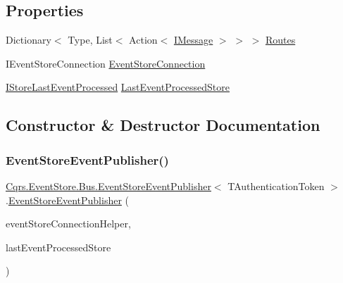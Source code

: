 \subsection*{Properties}
\begin{DoxyCompactItemize}
\item 
Dictionary$<$ Type, List$<$ Action$<$ \hyperlink{interfaceCqrs_1_1Messages_1_1IMessage}{I\+Message} $>$ $>$ $>$ \hyperlink{classCqrs_1_1EventStore_1_1Bus_1_1EventStoreEventPublisher_a89bf01d1921bc517ea8b385c0ee724ee}{Routes}
\item 
I\+Event\+Store\+Connection \hyperlink{classCqrs_1_1EventStore_1_1Bus_1_1EventStoreEventPublisher_a16df48a7203bc3bcde5f5a12f1d47934}{Event\+Store\+Connection}
\item 
\hyperlink{interfaceCqrs_1_1Bus_1_1IStoreLastEventProcessed}{I\+Store\+Last\+Event\+Processed} \hyperlink{classCqrs_1_1EventStore_1_1Bus_1_1EventStoreEventPublisher_a552a16f86c52837bf81200778e3a9fe4}{Last\+Event\+Processed\+Store}
\end{DoxyCompactItemize}


\subsection{Constructor \& Destructor Documentation}
\mbox{\label{classCqrs_1_1EventStore_1_1Bus_1_1EventStoreEventPublisher_a4ca16479fe387fae0135865ae3f889d7}} 
\subsubsection{\texorpdfstring{Event\+Store\+Event\+Publisher()}{EventStoreEventPublisher()}}
{\footnotesize\ttfamily \hyperlink{classCqrs_1_1EventStore_1_1Bus_1_1EventStoreEventPublisher}{Cqrs.\+Event\+Store.\+Bus.\+Event\+Store\+Event\+Publisher}$<$ T\+Authentication\+Token $>$.\hyperlink{classCqrs_1_1EventStore_1_1Bus_1_1EventStoreEventPublisher}{Event\+Store\+Event\+Publisher} (\begin{DoxyParamCaption}\item[{\hyperlink{interfaceCqrs_1_1EventStore_1_1IEventStoreConnectionHelper}{I\+Event\+Store\+Connection\+Helper}}]{event\+Store\+Connection\+Helper,  }\item[{\hyperlink{interfaceCqrs_1_1Bus_1_1IStoreLastEventProcessed}{I\+Store\+Last\+Event\+Processed}}]{last\+Event\+Processed\+Store }\end{DoxyParamCaption})}



